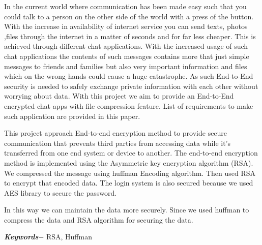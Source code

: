 In the current world where communication has been made easy such that you could talk to a person on the other side of the world with a press of the button. With the increase in availability of internet service you can send texts, photos ,files through the internet in a matter of seconds and for far less cheaper. This is achieved through different chat applications. With the increased usage of such chat applications the contents of such messages contains more that just simple messages to friends and families but also very important information and files which on the wrong hands could cause a huge catastrophe. As such End-to-End security is needed to safely exchange private information with each other without worrying about data. With this project we aim to provide an End-to-End encrypted chat apps with file compression feature. List of requirements to make such application are provided in this paper.\cite{Chauhan2016}

This project approach End-to-end encryption method to provide  secure communication that prevents third parties from accessing data while it's transferred from one end system or device to another.
The end-to-end encryption method is implemented using the Asymmetric key encryption algorithm (RSA). We compressed the message using huffman Encoding algorithm. Then used RSA to encrypt that encoded data. The login system is also secured because we used AES library to secure the password.

In this way we can maintain the data more securely.
Since we used huffman to compress the data and RSA algorithm for securing the data.\cite{sa}

\par
\textbf{\textit{Keywords$-$}} RSA, Huffman



	{
		\KECadjusttocspacings %
		\makeatletter
		\def\@makeschapterhead#1{%
			{\newpage \parindent \z@ \raggedright
					\normalfont
					\interlinepenalty\@M
					\center \fontsize{16pt}{1} \bfseries \MakeUppercase{#1}\par\nobreak
					\vskip 18\p@ %
				}}
		\makeatother

		\tableofcontents %
		\listoffigures %
	}

